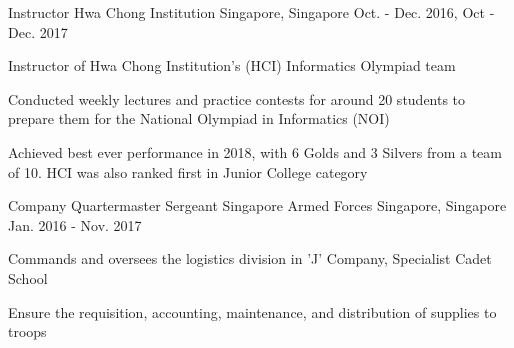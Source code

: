 \begin{cventries}
  \cventry
    {Instructor} %
    {Hwa Chong Institution} %
    {Singapore, Singapore} %
    {Oct. - Dec. 2016, Oct - Dec. 2017} %
    {
      \begin{cvitems} %
      \item { Instructor of Hwa Chong Institution’s (HCI) Informatics Olympiad team}
      \item { Conducted weekly lectures and practice contests for around 20 students to prepare them for the National Olympiad in Informatics (NOI)}
      \item { Achieved best ever performance in 2018, with 6 Golds and 3 Silvers from a team of 10. HCI was also ranked first in Junior College category}
      \end{cvitems}
    }

  \cventry
    {Company Quartermaster Sergeant} %
    {Singapore Armed Forces} %
    {Singapore, Singapore} %
    {Jan. 2016 - Nov. 2017} %
    {
      \begin{cvitems} %
      \item {Commands and oversees the logistics division in ’J’ Company, Specialist Cadet School}
      \item {Ensure the requisition, accounting, maintenance, and distribution of supplies to troops}
      \end{cvitems}
    }

\end{cventries}
